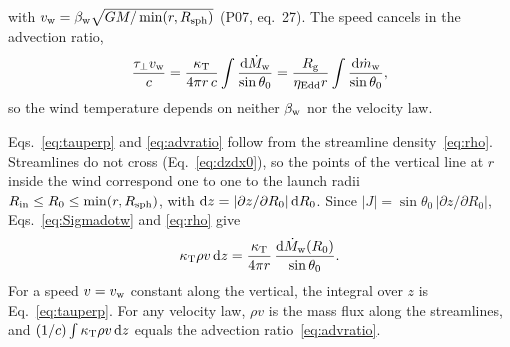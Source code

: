 with $v_{\rm w} = \beta_{\rm w}\sqrt{GM/\min(r, R_{\rm sph})}$ (P07, eq.~27).
The speed cancels in the advection ratio,
\begin{equation}
\frac{\tau_\perp v_{\rm w}}{c} = \frac{\kappa_{\rm T}}{4\pi r\,c} \int \frac{{\rm d}\dot M_{\rm w}}{\sin\theta_0}
= \frac{R_{\rm g}}{\eta_{\rm Edd} r} \int \frac{{\rm d}\dot m_{\rm w}}{\sin\theta_0} ,
\label{eq:advratio}
\end{equation}
so the wind temperature depends on neither $\beta_{\rm w}$ nor the velocity law.

Eqs.~\eqref{eq:tauperp} and \eqref{eq:advratio} follow from the streamline density~\eqref{eq:rho}.
Streamlines do not cross (Eq.~\ref{eq:dzdx0}), so the points of the vertical line at $r$ inside the wind correspond one to one to the launch radii $R_{\rm in} \le R_0 \le \min(r, R_{\rm sph})$, with ${\rm d}z = |\partial z/\partial R_0|\,{\rm d}R_0$.
Since $|J| = \sin\theta_0\,|\partial z/\partial R_0|$, Eqs.~\eqref{eq:Sigmadotw} and \eqref{eq:rho} give
\begin{equation}
\kappa_{\rm T}\rho v\,{\rm d}z = \frac{\kappa_{\rm T}}{4\pi r}\,\frac{{\rm d}\dot M_{\rm w}(R_0)}{\sin\theta_0} .
\label{eq:column_element}
\end{equation}
For a speed $v = v_{\rm w}$ constant along the vertical, the integral over $z$ is Eq.~\eqref{eq:tauperp}.
For any velocity law, $\rho v$ is the mass flux along the streamlines, and $(1/c)\int\kappa_{\rm T}\rho v\,{\rm d}z$ equals the advection ratio~\eqref{eq:advratio}.

